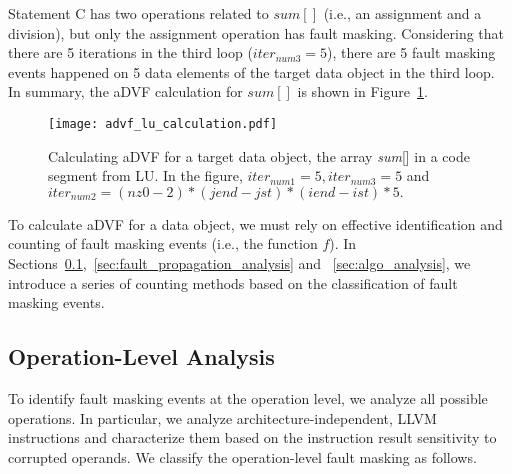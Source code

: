 Statement C has two operations 
related to $sum[]$ (i.e., an assignment and a division), but only the assignment operation has fault masking.
Considering that there are 5 iterations in the third loop ($iter_{num3} = 5$), there are 5 fault masking events happened on 5 data elements of the target data object in the third loop. In 
summary, the aDVF calculation for $sum[]$ is shown in Figure~\ref{fig:advf_cal}.  

\begin{comment}
\begin{figure}[t]
	\centering
	\vspace{-10pt}
	\texttt{[image: advf\_example.pdf]}
	\vspace{-15pt}
	\caption{A code segment from LU. }
	\label{fig:advf_example}
	\vspace{-10pt}
\end{figure}
\end{comment}

\begin{figure}
	\centering
	\texttt{[image: advf\_lu\_calculation.pdf]}
	\vspace{-8pt}
	\caption{Calculating aDVF for a target data object, the array \textit{sum}[] in a code segment from LU. In the figure, $iter_{num1}=5, iter_{num3}=5$ and $iter_{num2} = (nz0-2)*(jend-jst)*(iend-ist)*5.$}
	\label{fig:advf_cal}
	\vspace{-15pt}
\end{figure}

To calculate aDVF for a data object, we must rely on effective identification and counting of fault masking events (i.e., the function $f$).
In Sections~\ref{sec:statement_analysis},~\ref{sec:fault_propagation_analysis} and ~\ref{sec:algo_analysis}, 
we introduce a series of counting methods based on the classification of fault masking events. %

\subsection{Operation-Level Analysis}
\label{sec:statement_analysis}
To identify fault masking events at the operation level, we analyze 
all possible operations. %
In particular, we analyze 
architecture-independent, LLVM instructions %
and characterize them based on the instruction result sensitivity to corrupted operands. We classify the operation-level fault masking as follows. 

